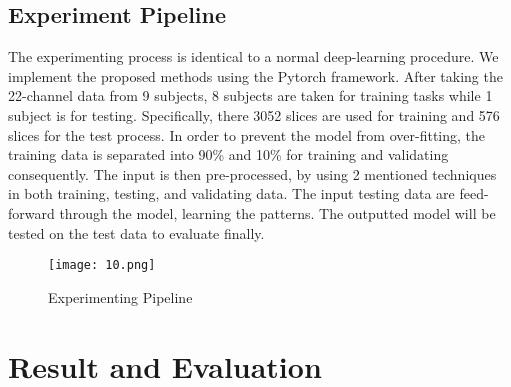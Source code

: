 \documentclass[]{report}
\begin{document}
\section{Experiment Pipeline}
The experimenting process is identical to a normal deep-learning procedure. We implement the
proposed methods using the Pytorch framework.
After taking the 22-channel data from 9 subjects, 8 subjects are taken for training tasks while 1 subject is for testing. Specifically, there 3052 slices are used for training and 576 slices for the test process. In order to prevent the model from over-fitting, the training data is separated into 90\% and 10\% for training and validating consequently. The input is then pre-processed, by using 2 mentioned techniques in both training, testing, and validating data. 
The input testing data are feed-forward through the model, learning the patterns. The outputted model will be tested on the test data to evaluate finally. 
\begin{figure}[H]
    \centering
    \texttt{[image: 10.png]}
    \caption{Experimenting Pipeline}
    \label{fig:enter-label}
\end{figure}
\newpage
\chapter*{Result and Evaluation}
\end{document}
